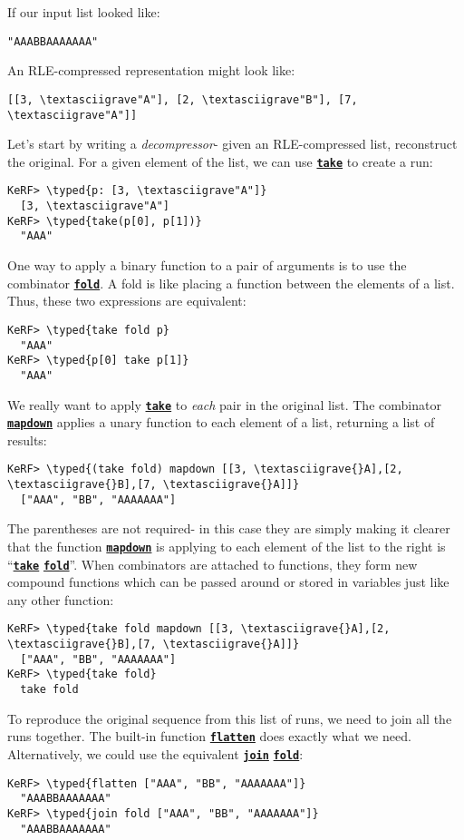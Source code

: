 \documentclass{article}
\newcommand{\typed}[1]{\textcolor{TealBlue}{#1}}
\newcommand{\primu}[2]{\hyperref[prim:#2]{\textbf{\texttt{#1}}}}
\newcommand{\prim}[1]{\primu{#1}{#1}}
\newcommand{\comb}[1]{\primu{#1}{#1}}
\begin{document}
\vspace{0.5cm}

If our input list looked like:
\begin{Verbatim}
"AAABBAAAAAAA"
\end{Verbatim}

An RLE-compressed representation might look like:
\begin{Verbatim}
[[3, \textasciigrave"A"], [2, \textasciigrave"B"], [7, \textasciigrave"A"]]
\end{Verbatim}

Let's start by writing a \emph{decompressor}- given an RLE-compressed list, reconstruct the original. For a given element of the list, we can use \prim{take} to create a run:
\begin{Verbatim}
KeRF> \typed{p: [3, \textasciigrave"A"]}
  [3, \textasciigrave"A"]
KeRF> \typed{take(p[0], p[1])}
  "AAA"
\end{Verbatim}

One way to apply a binary function to a pair of arguments is to use the combinator \comb{fold}. A fold is like placing a function between the elements of a list. Thus, these two expressions are equivalent:
\begin{Verbatim}
KeRF> \typed{take fold p}
  "AAA"
KeRF> \typed{p[0] take p[1]}
  "AAA"
\end{Verbatim}

We really want to apply \prim{take} to \emph{each} pair in the original list. The combinator \comb{mapdown} applies a unary function to each element of a list, returning a list of results:
\begin{Verbatim}
KeRF> \typed{(take fold) mapdown [[3, \textasciigrave{}A],[2, \textasciigrave{}B],[7, \textasciigrave{}A]]}
  ["AAA", "BB", "AAAAAAA"]
\end{Verbatim}

The parentheses are not required- in this case they are simply making it clearer that the function \comb{mapdown} is applying to each element of the list to the right is ``\prim{take} \comb{fold}''. When combinators are attached to functions, they form new compound functions which can be passed around or stored in variables just like any other function:
\begin{Verbatim}
KeRF> \typed{take fold mapdown [[3, \textasciigrave{}A],[2, \textasciigrave{}B],[7, \textasciigrave{}A]]}
  ["AAA", "BB", "AAAAAAA"]
KeRF> \typed{take fold}
  take fold
\end{Verbatim}

To reproduce the original sequence from this list of runs, we need to join all the runs together. The built-in function \prim{flatten} does exactly what we need. Alternatively, we could use the equivalent \prim{join} \comb{fold}:
\begin{Verbatim}
KeRF> \typed{flatten ["AAA", "BB", "AAAAAAA"]}
  "AAABBAAAAAAA"
KeRF> \typed{join fold ["AAA", "BB", "AAAAAAA"]}
  "AAABBAAAAAAA"
\end{Verbatim}
\end{document}
